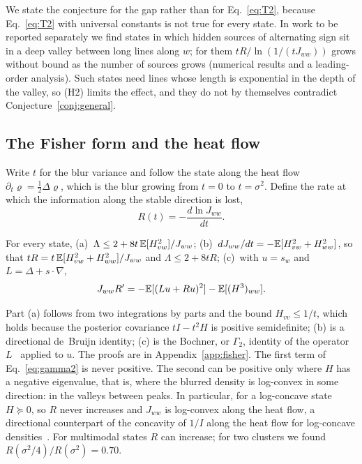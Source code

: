 We state the conjecture for the gap rather than for Eq.~\eqref{eq:T2}, because Eq.~\eqref{eq:T2} with universal constants is not true for every state. In work to be reported separately we find states in which hidden sources of alternating sign sit in a deep valley between long lines along $w$; for them $tR/\ln(1/(tJ_{ww}))$ grows without bound as the number of sources grows (numerical results and a leading-order analysis). Such states need lines whose length is exponential in the depth of the valley, so (H2) limits the effect, and they do not by themselves contradict Conjecture~\ref{conj:general}.

\subsection{The Fisher form and the heat flow}

Write $t$ for the blur variance and follow the state along the heat flow $\partial_t\varrho = \frac12\Delta\varrho$, which is the blur growing from $t = 0$ to $t = \sigma^2$. Define the rate at which the information along the stable direction is lost,
\begin{equation}
R(t) = -\frac{d\ln J_{ww}}{dt} .
\label{eq:Rdef}
\end{equation}

\begin{lemma}
\label{lem:fisher}
For every state, (a)~$\Lambda \leq 2 + 8t\,\mathbb{E}[H_{vw}^2]/J_{ww}$; (b)~$dJ_{ww}/dt = -\mathbb{E}[H_{vw}^2 + H_{ww}^2]$, so that $tR = t\,\mathbb{E}[H_{vw}^2 + H_{ww}^2]/J_{ww}$ and $\Lambda \leq 2 + 8tR$; (c)~with $u = s_w$ and $L = \Delta + s\cdot\nabla$,
\begin{equation}
J_{ww}R' = -\mathbb{E}[(Lu + Ru)^2] - \mathbb{E}[(H^3)_{ww}] .
\label{eq:gamma2}
\end{equation}
\end{lemma}

Part (a) follows from two integrations by parts and the bound $H_{vv} \leq 1/t$, which holds because the posterior covariance $t I - t^2 H$ is positive semidefinite; (b) is a directional de~Bruijn identity; (c) is the Bochner, or $\Gamma_2$, identity of the operator $L$~\cite{bakry2014} applied to $u$. The proofs are in Appendix~\ref{app:fisher}. The first term of Eq.~\eqref{eq:gamma2} is never positive. The second can be positive only where $H$ has a negative eigenvalue, that is, where the blurred density is log-convex in some direction: in the valleys between peaks. In particular, for a log-concave state $H \succeq 0$, so $R$ never increases and $J_{ww}$ is log-convex along the heat flow, a directional counterpart of the concavity of $1/I$ along the heat flow for log-concave densities~\cite{toscani2015}. For multimodal states $R$ can increase; for two clusters we found $R(\sigma^2/4)/R(\sigma^2) = 0.70$.

